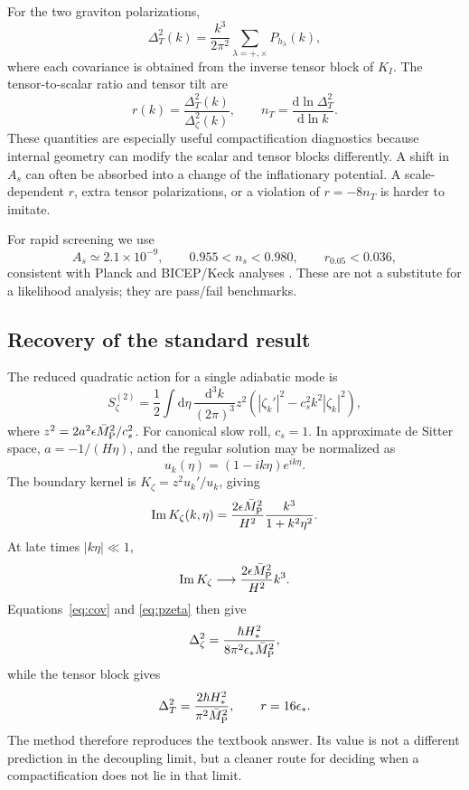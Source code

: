 \documentclass[11pt,a4paper]{article}
\newcommand{\Mpl}{\bar M_{\rm P}}
\newcommand{\dd}{\mathrm d}
\begin{document}
For the two graviton polarizations,
\begin{equation}
\Delta_T^2(k)=\frac{k^3}{2\pi^2}\sum_{\lambda=+,\times}P_{h_\lambda}(k),
\end{equation}
where each covariance is obtained from the inverse tensor block of $K_I$. The tensor-to-scalar ratio and tensor tilt are
\begin{equation}
r(k)=\frac{\Delta_T^2(k)}{\Delta_\zeta^2(k)},\qquad
n_T=\frac{\dd\ln\Delta_T^2}{\dd\ln k}.
\end{equation}
These quantities are especially useful compactification diagnostics because internal geometry can modify the scalar and tensor blocks differently. A shift in $A_s$ can often be absorbed into a change of the inflationary potential. A scale-dependent $r$, extra tensor polarizations, or a violation of $r=-8n_T$ is harder to imitate.

For rapid screening we use
\begin{equation}
A_s\simeq2.1\times10^{-9},\qquad
0.955<n_s<0.980,\qquad r_{0.05}<0.036,
\label{eq:screen}
\end{equation}
consistent with Planck and BICEP/Keck analyses \cite{PlanckInflation2020,BICEPKeck2021,BICEPKeckReview2024}. These are not a substitute for a likelihood analysis; they are pass/fail benchmarks.

\subsection{Recovery of the standard result}
The reduced quadratic action for a single adiabatic mode is
\begin{equation}
S_\zeta^{(2)}=\frac12\int\dd\eta\,\frac{\dd^3k}{(2\pi)^3}z^2
\left(|\zeta_k'|^2-c_s^2k^2|\zeta_k|^2\right),
\end{equation}
where $z^2=2a^2\epsilon\Mpl^2/c_s^2$. For canonical slow roll, $c_s=1$. In approximate de Sitter space, $a=-1/(H\eta)$, and the regular solution may be normalized as
\begin{equation}
u_k(\eta)=(1-ik\eta)e^{ik\eta}.
\end{equation}
The boundary kernel is $K_\zeta=z^2u_k'/u_k$, giving
\begin{equation}
\operatorname{Im}K_\zeta(k,\eta)=
\frac{2\epsilon\Mpl^2}{H^2}\frac{k^3}{1+k^2\eta^2}.
\end{equation}
At late times $|k\eta|\ll1$,
\begin{equation}
\operatorname{Im}K_\zeta\longrightarrow
\frac{2\epsilon\Mpl^2}{H^2}k^3.
\end{equation}
Equations~\eqref{eq:cov} and \eqref{eq:pzeta} then give
\begin{equation}
\Delta_\zeta^2=\frac{\hbar H_*^2}{8\pi^2\epsilon_*\Mpl^2},
\end{equation}
while the tensor block gives
\begin{equation}
\Delta_T^2=\frac{2\hbar H_*^2}{\pi^2\Mpl^2},\qquad r=16\epsilon_*.
\end{equation}
The method therefore reproduces the textbook answer. Its value is not a different prediction in the decoupling limit, but a cleaner route for deciding when a compactification does not lie in that limit.
\end{document}
